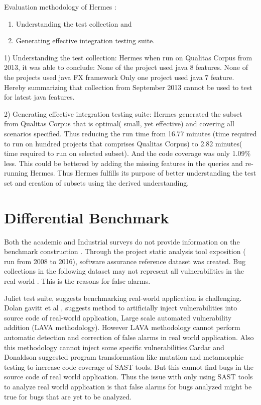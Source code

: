 \documentclass[authoryear,preprint]{sigplanconf}
\begin{document}
Evaluation methodology of Hermes : 
\begin{enumerate}
	\item Understanding the test collection and 
	\item Generating effective integration testing suite.
\end{enumerate}

1) Understanding the test collection:
Hermes when run on Qualitas Corpus from 2013, it was able to conclude: None of the project used java 8 features. None of the projects used java FX framework Only one project used java 7 feature. Hereby summarizing that collection from September 2013 cannot be used to test for latest java features.

2) Generating effective integration testing suite:
Hermes generated the subset from Qualitas Corpus that is optimal( small, yet effective) and covering all scenarios specified. Thus reducing the run time from 16.77 minutes (time required to run on hundred projects that comprises Qualitas Corpus) to 2.82 minutes( time required to run on selected subset). And the code coverage was only 1.09\% less. This could be bettered by adding the missing features in the queries and re-running Hermes. Thus Hermes fulfills its purpose of better understanding the test set and creation of subsets using the derived understanding.

\section{Differential Benchmark}
\label{sec:sec_differential_benchmark}
Both the academic and Industrial surveys do not provide information on the benchmark construction\cite{5954458} \cite{5689543} . Through the project static analysis tool exposition ( run from 2008 to 2016), software assurance reference dataset was created. Bug collections in the following dataset may not represent all vulnerabilities in the real world\cite{greiman2016iccws} \cite{Kupsch2009ManualVA} \cite{Wilander250309}. This is the reasons for false alarms.

Juliet test suite, suggests benchmarking real-world application is challenging. Dolan gavitt et al \cite{7546498}, suggests method to artificially inject vulnerabilities into source code of real-world application, Large scale automated vulnerability addition (LAVA methodology). However LAVA methodology cannot perform automatic detection and correction of false alarms in real world application. Also this methodology cannot inject some specific vulnerabilities.Cardar and Donaldson \cite{Cadar:2016:APA:2889160.2889206} suggested program transformation like mutation and metamorphic testing to increase code coverage of SAST tools. But this cannot find bugs in the source code of  real world application. Thus the issue with only using SAST tools to analyze real world application is that false alarms for bugs analyzed might be true for bugs that are yet to be analyzed.
\end{document}
